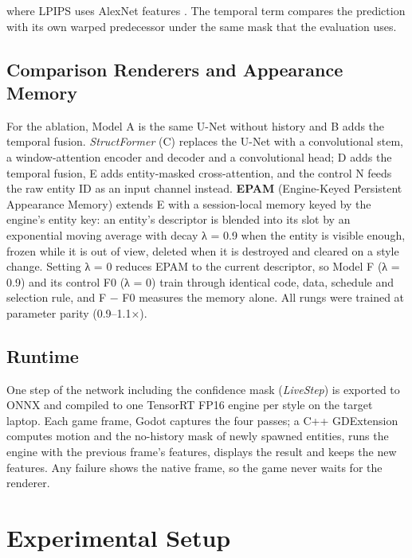 \documentclass[conference]{IEEEtran}
\begin{document}
where LPIPS uses AlexNet features \cite{lpips}. The temporal term compares the prediction with its own warped predecessor under the same mask that the evaluation uses.

\subsection{Comparison Renderers and Appearance Memory}

For the ablation, Model A is the same U-Net without history and B adds the temporal fusion. \textit{StructFormer} (C) replaces the U-Net with a convolutional stem, a window-attention encoder and decoder \cite{swin} and a convolutional head; D adds the temporal fusion, E adds entity-masked cross-attention, and the control N feeds the raw entity ID as an input channel instead. \textbf{EPAM} (Engine-Keyed Persistent Appearance Memory) extends E with a session-local memory keyed by the engine's entity key: an entity's descriptor is blended into its slot by an exponential moving average with decay λ = 0.9 when the entity is visible enough, frozen while it is out of view, deleted when it is destroyed and cleared on a style change. Setting λ = 0 reduces EPAM to the current descriptor, so Model F (λ = 0.9) and its control F0 (λ = 0) train through identical code, data, schedule and selection rule, and F − F0 measures the memory alone. All rungs were trained at parameter parity (0.9–1.1×).

\subsection{Runtime}

One step of the network including the confidence mask (\textit{LiveStep}) is exported to ONNX and compiled to one TensorRT FP16 engine per style on the target laptop. Each game frame, Godot captures the four passes; a C++ GDExtension \cite{godotcpp} computes motion and the no-history mask of newly spawned entities, runs the engine with the previous frame's features, displays the result and keeps the new features. Any failure shows the native frame, so the game never waits for the renderer.

\section{Experimental Setup}\label{sec:setup}
\end{document}

